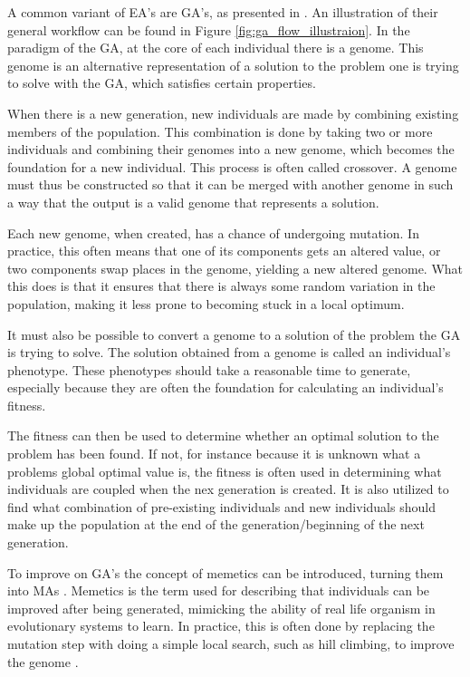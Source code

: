 A common variant of EA's are GA's, as presented in \citet{holland1975originalGA}. An illustration of their general workflow can be found in Figure \ref{fig:ga_flow_illustraion}. In the paradigm of the GA, at the core of each individual there is a genome. This genome is an alternative representation of a solution to the problem one is trying to solve with the GA, which satisfies certain properties.

When there is a new generation, new individuals are made by combining existing members of the population. This combination is done by taking two or more individuals and combining their genomes into a new genome, which becomes the foundation for a new individual. This process is often called crossover. A genome must thus be constructed so that it can be merged with another genome in such a way that the output is a valid genome that represents a solution.

Each new genome, when created, has a chance of undergoing mutation. In practice, this often means that one of its components gets an altered value, or two components swap places in the genome, yielding a new altered genome. What this does is that it ensures that there is always some random variation in the population, making it less prone to becoming stuck in a local optimum.

It must also be possible to convert a genome to a solution of the problem the GA is trying to solve. The solution obtained from a genome is called an individual's phenotype. These phenotypes should take a reasonable time to generate, especially because they are often the foundation for calculating an individual's fitness.

The fitness can then be used to determine whether an optimal solution to the problem has been found. If not, for instance because it is unknown what a problems global optimal value is, the fitness is often used in determining what individuals are coupled when the nex generation is created. It is also utilized to find what combination of pre-existing individuals and new individuals should make up the population at the end of the generation/beginning of the next generation.

To improve on GA's the concept of memetics can be introduced, turning them into MAs \citep{moscato1989memeticism}. Memetics is the term used for describing that individuals can be improved after being generated, mimicking the ability of real life organism in evolutionary systems to learn. In practice, this is often done by replacing the mutation step with doing a simple local search, such as hill climbing, to improve the genome \citep{lacomme2004competitiveMA}.

